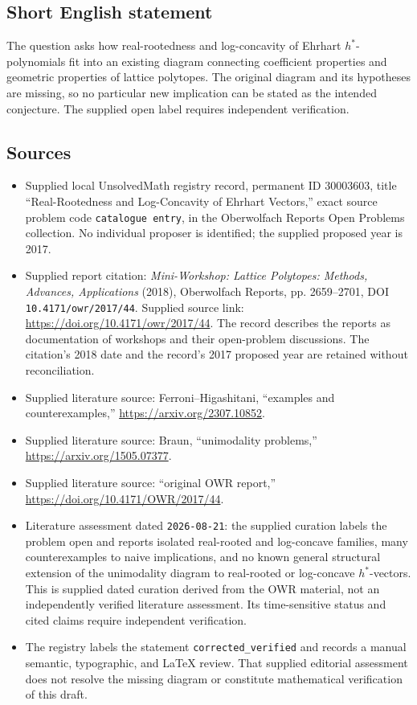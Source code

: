 \documentclass[11pt]{article}
\begin{document}
\subsection{Short English statement}
The question asks how real-rootedness and log-concavity of Ehrhart \(h^*\)-polynomials fit into an existing diagram connecting coefficient properties and geometric properties of lattice polytopes. The original diagram and its hypotheses are missing, so no particular new implication can be stated as the intended conjecture. The supplied open label requires independent verification.
\subsection{Sources}
\begin{itemize}
\item Supplied local UnsolvedMath registry record, permanent ID \(30003603\), title ``Real-Rootedness and Log-Concavity of Ehrhart Vectors,'' exact source problem code \texttt{catalogue entry}, in the Oberwolfach Reports Open Problems collection. No individual proposer is identified; the supplied proposed year is 2017.
\item Supplied report citation: \emph{Mini-Workshop: Lattice Polytopes: Methods, Advances, Applications} (2018), Oberwolfach Reports, pp. 2659--2701, DOI \texttt{10.4171/owr/2017/44}. Supplied source link: \url{https://doi.org/10.4171/owr/2017/44}. The record describes the reports as documentation of workshops and their open-problem discussions. The citation's 2018 date and the record's 2017 proposed year are retained without reconciliation.
\item Supplied literature source: Ferroni--Higashitani, ``examples and counterexamples,'' \url{https://arxiv.org/2307.10852}.
\item Supplied literature source: Braun, ``unimodality problems,'' \url{https://arxiv.org/1505.07377}.
\item Supplied literature source: ``original OWR report,'' \url{https://doi.org/10.4171/OWR/2017/44}.
\item Literature assessment dated \texttt{2026-08-21}: the supplied curation labels the problem open and reports isolated real-rooted and log-concave families, many counterexamples to naive implications, and no known general structural extension of the unimodality diagram to real-rooted or log-concave \(h^*\)-vectors. This is supplied dated curation derived from the OWR material, not an independently verified literature assessment. Its time-sensitive status and cited claims require independent verification.
\item The registry labels the statement \texttt{corrected\_verified} and records a manual semantic, typographic, and LaTeX review. That supplied editorial assessment does not resolve the missing diagram or constitute mathematical verification of this draft.
\end{itemize}
\end{document}
